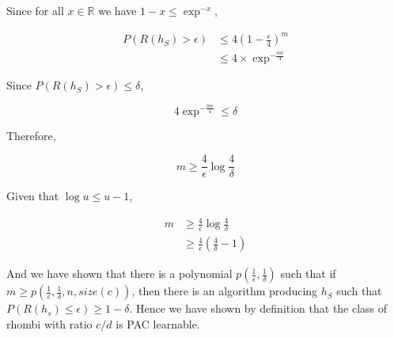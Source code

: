Since for all $x \in \mathbb{R}$ we have $1 - x \leq \exp^{-x}$,

\begin{equation}
\begin{aligned}
P(R(h_S)>\epsilon) &\leq 4(1 - \frac{\epsilon}{4})^m\\
&\leq 4 \times \exp^{-\frac{m\epsilon}{4}}
\end{aligned}\label{eq13}
\end{equation}

Since $P(R(h_S) > \epsilon) \leq \delta$,

\begin{equation}\label{eq14}
4\exp^{-\frac{m\epsilon}{4}} \leq \delta
\end{equation}

Therefore,

\begin{equation}\label{eq15}
m \geq \frac{4}{\epsilon} \log \frac{4}{\delta}
\end{equation}

Given that $\log u \leq u - 1$,

\begin{equation}\label{eq16}
\begin{aligned}
m &\geq \frac{4}{\epsilon} \log \frac{4}{\delta}\\
& \geq \frac{4}{\epsilon} (\frac{4}{\delta} - 1)
\end{aligned}
\end{equation}

And we have shown that there is a polynomial $p(\frac{1}{\epsilon}, \frac{1}{\delta})$ such that if $m \geq p(\frac{1}{\epsilon},\frac{1}{\delta},n,size(c))$, then there is an algorithm producing $h_S$ such that $P(R(h_s) \leq \epsilon) \geq 1 - \delta$.
Hence we have shown by definition that the class of rhombi with ratio $c/d$ is PAC learnable.
